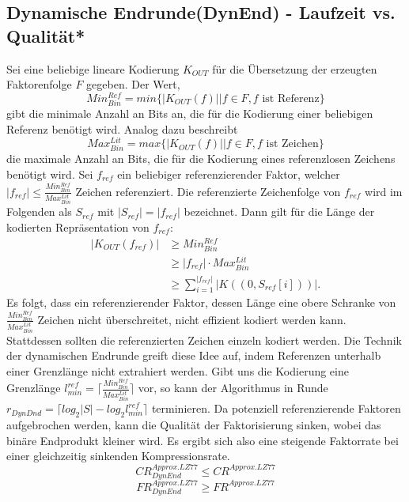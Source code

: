 \subsection{Dynamische Endrunde(DynEnd) - Laufzeit vs. Qualität*}
Sei eine beliebige lineare Kodierung $K_{OUT}$ für die Übersetzung der erzeugten Faktorenfolge $F$ gegeben. Der Wert,
\begin{equation}
    Min^{Ref}_{Bin}=min\{|K_{OUT}(f)| | f \in F ,f \text{ ist Referenz}\}
\end{equation}
gibt die minimale Anzahl an Bits an, die für die Kodierung einer beliebigen Referenz benötigt wird. Analog dazu beschreibt
\begin{equation}
    Max^{Lit}_{Bin}=max\{|K_{OUT}(f)| | f \in F, f \text{ ist Zeichen}\}
\end{equation}
die maximale Anzahl an Bits, die für die Kodierung eines referenzlosen Zeichens benötigt wird. Sei $f_{ref}$ ein beliebiger referenzierender Faktor, welcher 
$|f_{ref}|\leq\frac{Min^{Ref}_{Bin}}{Max^{Lit}_{Bin}}$ Zeichen referenziert. Die referenzierte Zeichenfolge von $f_{ref}$ wird im Folgenden als $S_{ref}$ mit $|S_{ref}|=|f_{ref}|$ bezeichnet.
Dann gilt für die Länge der kodierten Repräsentation von $f_{ref}$:
\begin{equation}
\begin{split}
    |K_{OUT}(f_{ref})| & \geq Min^{Ref}_{Bin}\\
    & \geq |f_{ref}| \cdot Max^{Lit}_{Bin}\\
    & \geq \sum_{i=1}^{|f_{ref}|} |K((0, S_{ref}[i]))|.
\end{split}
\end{equation}
Es folgt, dass ein referenzierender Faktor, dessen Länge eine obere Schranke von $\frac{Min^{Ref}_{Bin}}{Max^{Lit}_{Bin}}$ Zeichen nicht überschreitet, nicht effizient kodiert werden kann.
Stattdessen sollten die referenzierten Zeichen einzeln kodiert werden. Die Technik der dynamischen Endrunde greift diese Idee auf, indem Referenzen unterhalb einer Grenzlänge nicht extrahiert
werden. Gibt uns die Kodierung eine Grenzlänge $l^{ref}_{min} = \lceil\frac{Min^{Ref}_{Bin}}{Max^{Lit}_{Bin}}\rceil$ vor, so kann der Algorithmus in Runde 
$r_{DynDnd} = \lceil log_2{|S|}-log_2{l^{ref}_{min}} \rceil$ terminieren. Da potenziell referenzierende Faktoren aufgebrochen werden, kann die Qualität der Faktorisierung sinken, wobei das 
binäre Endprodukt kleiner wird. Es ergibt sich also eine steigende Faktorrate bei einer gleichzeitig sinkenden Kompressionsrate.
\begin{equation}
    CR^{Approx.LZ77}_{DynEnd} \leq CR^{Approx.LZ77}
\end{equation}
\begin{equation}
    FR^{Approx.LZ77}_{DynEnd} \geq FR^{Approx.LZ77}
\end{equation}

